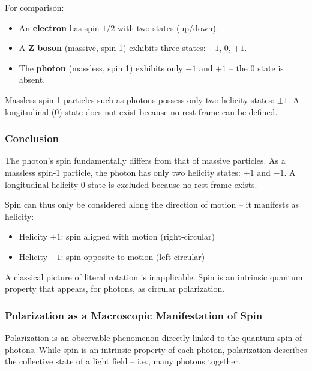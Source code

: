 \newpage
\noindent
For comparison:
\begin{itemize}
	\item An \textbf{electron} has spin $1/2$ with two states (up/down).
	\item A \textbf{Z boson} (massive, spin 1) exhibits three states: $-1$, $0$, $+1$.
	\item The \textbf{photon} (massless, spin 1) exhibits only $-1$ and $+1$ – the $0$ state is absent.
\end{itemize}
\vspace{1em}
\begin{tcolorbox}[physikbox, title=Didactic Rule of Thumb]
	\label{box:didaktischerMerksatz}
	Massless spin‑1 particles such as photons possess only two helicity states: \textbf{$\pm1$}. A longitudinal ($0$) state does not exist because no rest frame can be defined.
\end{tcolorbox}
\vspace{1em}

\subsubsection*{Conclusion}
The photon’s spin fundamentally differs from that of massive particles. As a massless spin‑1 particle, the photon has only two helicity states: $+1$ and $-1$. A longitudinal helicity‑0 state is excluded because no rest frame exists.

\vspace{0.5em}
Spin can thus only be considered along the direction of motion – it manifests as helicity:
\begin{itemize}
	\item Helicity $+1$: spin aligned with motion (right‑circular)
	\item Helicity $-1$: spin opposite to motion (left‑circular)
\end{itemize}
A classical picture of literal rotation is inapplicable. Spin is an intrinsic quantum property that appears, for photons, as circular polarization.

\subsubsection{Polarization as a Macroscopic Manifestation of Spin}

Polarization is an observable phenomenon directly linked to the quantum spin of photons. While spin is an intrinsic property of each photon, polarization describes the collective state of a light field – i.e., many photons together.

